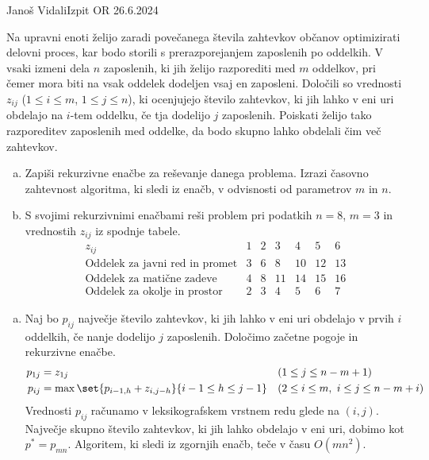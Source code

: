 \begin{naloga}{Janoš Vidali}{Izpit OR 26.6.2024}
\begin{vprasanje}
Na upravni enoti želijo zaradi povečanega števila zahtevkov občanov
optimizirati delovni proces,
kar bodo storili s prerazporejanjem zaposlenih po oddelkih.
V vsaki izmeni dela $n$ zaposlenih,
ki jih želijo razporediti med $m$ oddelkov,
pri čemer mora biti na vsak oddelek dodeljen vsaj en za\-pos\-le\-ni.
Določili so vrednosti $z_{ij}$ ($1 \le i \le m$, $1 \le j \le n$),
ki ocenjujejo število zahtevkov,
ki jih lahko v eni uri obdelajo na $i$-tem oddelku,
če tja dodelijo $j$ zaposlenih.
Poiskati želijo tako razporeditev zaposlenih med oddelke,
da bodo skupno lahko obdelali čim več zahtevkov.
\begin{enumerate}[(a)]
\item Zapiši rekurzivne enačbe za reševanje danega problema.
Izrazi časovno zahtevnost algoritma, ki sledi iz enačb,
v odvisnosti od parametrov $m$ in $n$.

\item S svojimi rekurzivnimi enačbami reši problem
pri podatkih $n = 8$, $m = 3$ in vred\-no\-stih $z_{ij}$ iz spodnje tabele.
$$
\begin{array}{r|cccccc}
z_{ij} & 1 & 2 & 3 & 4 & 5 & 6 \\ \hline
\text{Oddelek za javni red in promet} &  3 &  6 &  8 & 10 & 12 & 13 \\
\text{Oddelek za matične zadeve}      &  4 &  8 & 11 & 14 & 15 & 16 \\
\text{Oddelek za okolje in prostor}   &  2 &  3 &  4 &  5 &  6 &  7
\end{array}
$$
\end{enumerate}
\end{vprasanje}

\begin{odgovor}
\begin{enumerate}[(a)]
\item Naj bo $p_{ij}$ največje število zahtevkov,
ki jih lahko v eni uri obdelajo v prvih $i$ oddelkih,
če nanje dodelijo $j$ zaposlenih.
Določimo začetne pogoje in rekurzivne enačbe.
\begin{align*}
p_{1j} &= z_{1j} && (1 \le j \le n-m+1) \\
p_{ij} &= \max\set{p_{i-1,h} + z_{i,j-h}}{i-1 \le h \le j-1}
&& (2 \le i \le m, \ i \le j \le n-m+i)
\end{align*}
Vrednosti $p_{ij}$ računamo v leksikografskem vrstnem redu glede na $(i, j)$.
Največje skupno število zahtevkov, ki jih lahko obdelajo v eni uri,
dobimo kot $p^* = p_{mn}$.
Algoritem, ki sledi iz zgornjih enačb, teče v času $O(mn^2)$.


\end{enumerate}
\end{odgovor}
\end{naloga}
